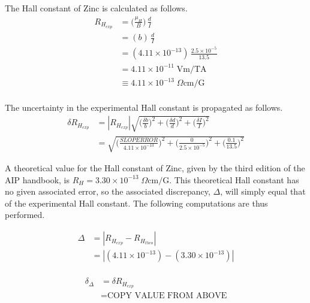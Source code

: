 \documentclass[a4paper]{article}
\begin{document}
The Hall constant of Zinc is calculated as follows.
\begin{align*}
R_{H_{exp}} &= \big( \frac{\mu_H}{B} \big) \, \frac{d}{I} \\
    &= (b) \, \frac{d}{I} \\
    &= (4.11 \times 10^{-13}) \, \frac{2.5 \times 10^{-5}}{13.5} \\
    &= 4.11 \times 10^{-11} \; \text{Vm/TA} \\
    &\equiv 4.11 \times 10^{-13} \; \Omega \text{cm/G} \\
\end{align*}

The uncertainty in the experimental Hall constant is propagated as follows.
\begin{align*}
\delta R_{H_{exp}} &= | R_{H_{exp}} | 
                      \sqrt{
                      	\Big( \frac{\delta b}{b} \Big) ^2
                      	+
                      	\Big( \frac{\delta d}{d} \Big) ^2
                      	+
                      	\Big( \frac{\delta I}{I} \Big) ^2
                      } \\
                       &=
                   	 \sqrt{
                      	\Big( \frac{SLOPERROR}{4.11 \times 10^{-13}} \Big) ^2
                      	+
                      	\Big( \frac{0}{2.5 \times 10^{-5}} \Big) ^2
                      	+
                      	\Big( \frac{0.1}{13.5} \Big) ^2
                      } 
\end{align*}

A theoretical value for the Hall constant of Zinc, given by the third
edition of the AIP handbook, is $R_H = 3.30 \times 10^{-13} \; \Omega 
\text{cm/G}$. This theoretical Hall constant has no given associated error, so the associated discrepancy, $\Delta$, will simply equal that of the experimental Hall constant. The following computations are thus performed.

\begin{align*}
\Delta &= | R_{H_{exp}} - R_{H_{theo}} | \\
	   &= | (4.11 \times 10^{-13}) - (3.30 \times 10^{-13}) | \\
\end{align*}

\begin{align*}
\delta_{\Delta} &= \delta R_{H_{exp}} \\
				&= \text{COPY VALUE FROM ABOVE} \\
\end{align*}
\end{document}
